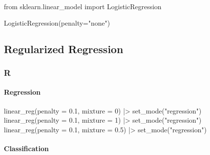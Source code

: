 \documentclass[
  letterpaper,
  DIV=11,
  numbers=noendperiod]{scrreprt}
\newenvironment{Shaded}{\begin{snugshade}}{\end{snugshade}}
\newcommand{\AttributeTok}[1]{\textcolor[rgb]{0.40,0.46,0.14}{#1}}
\newcommand{\DecValTok}[1]{\textcolor[rgb]{0.68,0.00,0.00}{#1}}
\newcommand{\FloatTok}[1]{\textcolor[rgb]{0.68,0.00,0.00}{#1}}
\newcommand{\FunctionTok}[1]{\textcolor[rgb]{0.28,0.35,0.67}{#1}}
\newcommand{\ImportTok}[1]{\textcolor[rgb]{0.00,0.46,0.62}{#1}}
\newcommand{\NormalTok}[1]{\textcolor[rgb]{0.00,0.46,0.62}{#1}}
\newcommand{\OperatorTok}[1]{\textcolor[rgb]{0.37,0.37,0.37}{#1}}
\newcommand{\SpecialCharTok}[1]{\textcolor[rgb]{0.37,0.37,0.37}{#1}}
\newcommand{\StringTok}[1]{\textcolor[rgb]{0.13,0.47,0.30}{#1}}
\let\oldparagraph\paragraph
\renewcommand{\paragraph}[1]{\oldparagraph{#1}\mbox{}}
\begin{document}
\begin{Shaded}
\begin{Highlighting}[]
\ImportTok{from}\NormalTok{ sklearn.linear\_model }\ImportTok{import}\NormalTok{ LogisticRegression}

\NormalTok{LogisticRegression(penalty}\OperatorTok{=}\StringTok{"none"}\NormalTok{)}
\end{Highlighting}
\end{Shaded}

\hypertarget{regularized-regression}{%
\subsection{Regularized Regression}\label{regularized-regression}}

\hypertarget{r-73}{%
\subsubsection{R}\label{r-73}}

\hypertarget{regression-2}{%
\paragraph{Regression}\label{regression-2}}

\begin{Shaded}
\begin{Highlighting}[]
\FunctionTok{linear\_reg}\NormalTok{(}\AttributeTok{penalty =} \FloatTok{0.1}\NormalTok{, }\AttributeTok{mixture =} \DecValTok{0}\NormalTok{) }\SpecialCharTok{|\textgreater{}} \FunctionTok{set\_mode}\NormalTok{(}\StringTok{"regression"}\NormalTok{)}
\FunctionTok{linear\_reg}\NormalTok{(}\AttributeTok{penalty =} \FloatTok{0.1}\NormalTok{, }\AttributeTok{mixture =} \DecValTok{1}\NormalTok{) }\SpecialCharTok{|\textgreater{}} \FunctionTok{set\_mode}\NormalTok{(}\StringTok{"regression"}\NormalTok{)}
\FunctionTok{linear\_reg}\NormalTok{(}\AttributeTok{penalty =} \FloatTok{0.1}\NormalTok{, }\AttributeTok{mixture =} \FloatTok{0.5}\NormalTok{) }\SpecialCharTok{|\textgreater{}} \FunctionTok{set\_mode}\NormalTok{(}\StringTok{"regression"}\NormalTok{)}
\end{Highlighting}
\end{Shaded}

\hypertarget{classification-2}{%
\paragraph{Classification}\label{classification-2}}
\end{document}
